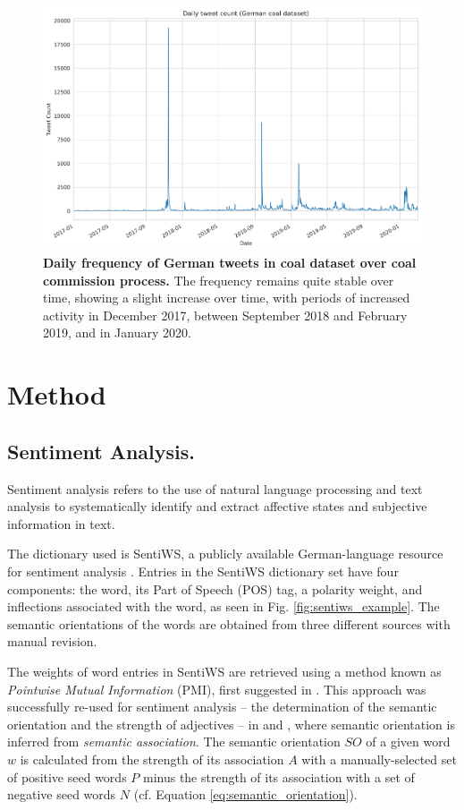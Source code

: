 \documentclass[12pt,onecolumn,twoside]{layout}
\begin{document}
\begin{figure}
	\begin{center}
		\includegraphics[width=0.9\linewidth]{figures/sa_tweet_frequency_zoom4}
	\end{center}
	\caption{\textbf{Daily frequency of German tweets in coal dataset over coal commission process.} The frequency remains quite stable over time, showing a slight increase over time, with periods of increased activity in December 2017, between September 2018 and February 2019, and in January 2020.}
	\label{fig:tweet_frequency}
\end{figure}

\section{Method} \label{sec:method}
\subsection*{Sentiment Analysis.}

Sentiment analysis refers to the use of natural language processing and text analysis to systematically identify and extract affective states and subjective information in text. %

The dictionary used is SentiWS, a publicly available German-language resource for sentiment analysis \citep{REMUS10.490}. Entries in the SentiWS dictionary set have four components: the word, its Part of Speech (POS) tag, a polarity weight, and inflections associated with the word, as seen in Fig. \ref{fig:sentiws_example}. The semantic orientations of the words are obtained from three different sources with manual revision.

The weights of word entries in SentiWS are retrieved using a method known as \emph{Pointwise Mutual Information} (PMI), first suggested in \citep{church-hanks-1990-word}. This approach was successfully re-used for sentiment analysis -- the determination of the semantic orientation and the strength of adjectives -- in \citep{Turney2002} and \citep{Turney2003}, where semantic orientation is inferred from \emph{semantic association}. The semantic orientation \(SO\) of a given word \(w\) is calculated from the strength of its association \(A\) with a manually-selected set of positive seed words \(P\) minus the strength of its association with a set of negative seed words \(N\) (cf. Equation \ref{eq:semantic_orientation}).
\end{document}
